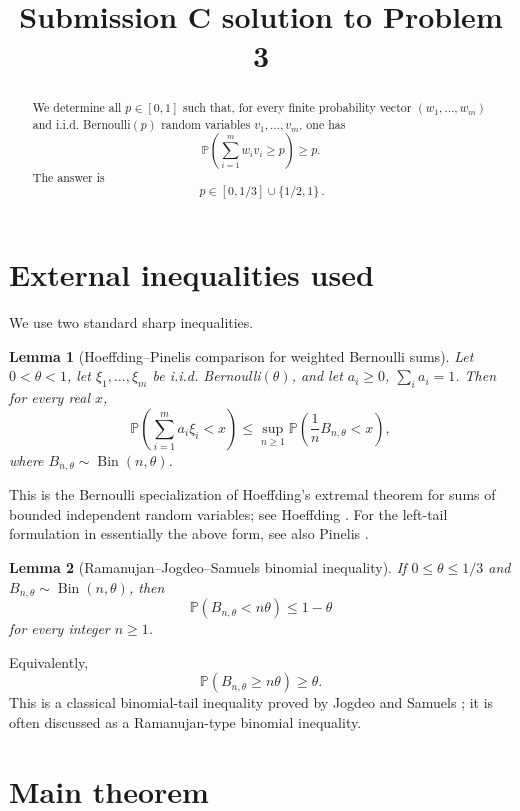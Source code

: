 \documentclass[11pt]{article}
\newtheorem{lemma}{Lemma}
\DeclareMathOperator{\Bin}{Bin}
\begin{document}
\title{Submission C solution to Problem 3}
\date{}
\maketitle


\begin{abstract}
We determine all \(p\in[0,1]\) such that, for every finite probability vector
\((w_1,\ldots,w_m)\) and i.i.d. Bernoulli\((p)\) random variables
\(v_1,\ldots,v_m\), one has
\[
\mathbb P\!\left(\sum_{i=1}^m w_i v_i\ge p\right)\ge p.
\]
The answer is
\[
\boxed{\,p\in[0,1/3]\cup\{1/2,1\}\, }.
\]
\end{abstract}

\section*{External inequalities used}

We use two standard sharp inequalities.

\begin{lemma}[Hoeffding--Pinelis comparison for weighted Bernoulli sums]
\label{lem:hoeffding}
Let \(0<\theta<1\), let \(\xi_1,\ldots,\xi_m\) be i.i.d. Bernoulli\((\theta)\), and let
\(a_i\ge0\), \(\sum_i a_i=1\). Then for every real \(x\),
\[
\mathbb P\!\left(\sum_{i=1}^m a_i\xi_i<x\right)
\le
\sup_{n\ge1}
\mathbb P\!\left(\frac1n B_{n,\theta}<x\right),
\]
where \(B_{n,\theta}\sim \Bin(n,\theta)\).
\end{lemma}

This is the Bernoulli specialization of Hoeffding's extremal theorem for sums of
bounded independent random variables; see Hoeffding \cite[Theorem 4]{Hoeffding1956}.
For the left-tail formulation in essentially the above form, see also Pinelis
\cite[Corollary 3.7]{Pinelis2016}.

\begin{lemma}[Ramanujan--Jogdeo--Samuels binomial inequality]
\label{lem:binomial}
If \(0\le \theta\le 1/3\) and \(B_{n,\theta}\sim \Bin(n,\theta)\), then
\[
\mathbb P(B_{n,\theta}<n\theta)\le 1-\theta
\]
for every integer \(n\ge1\).
\end{lemma}

Equivalently,
\[
\mathbb P(B_{n,\theta}\ge n\theta)\ge \theta .
\]
This is a classical binomial-tail inequality proved by Jogdeo and Samuels
\cite{JogdeoSamuels1968}; it is often discussed as a Ramanujan-type binomial
inequality.

\section*{Main theorem}
\end{document}
